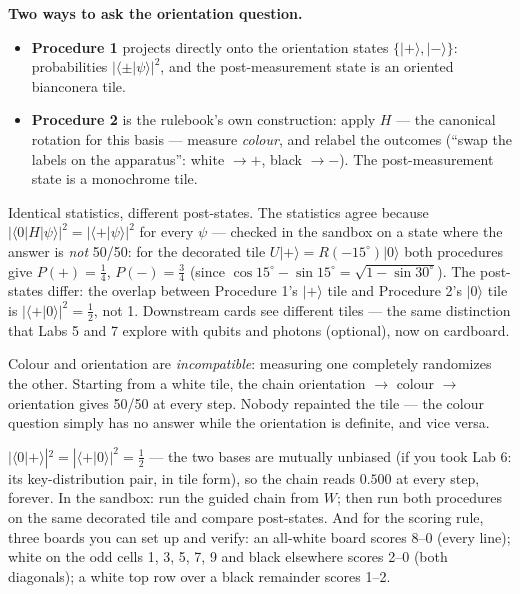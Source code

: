 \documentclass[a4paper,11pt]{article}
\providecommand{\ket}[1]{|#1\rangle}
\providecommand{\bra}[1]{\langle#1|}
\providecommand{\braket}[2]{\langle#1|#2\rangle}
\begin{document}
\begin{procedurebox}
\textbf{Two ways to ask the orientation question.}
\begin{itemize}
    \item \textbf{Procedure 1} projects directly onto the orientation states
          $\{\ket{+}, \ket{-}\}$: probabilities $|\braket{\pm}{\psi}|^2$, and the
          post-measurement state is an oriented bianconera tile.
    \item \textbf{Procedure 2} is the rulebook's own construction: apply $H$ --- the
          canonical rotation for this basis --- measure \emph{colour}, and relabel the
          outcomes (``swap the labels on the apparatus'': white $\to +$, black $\to -$). The
          post-measurement state is
          a monochrome tile.
\end{itemize}
Identical statistics, different post-states. The statistics agree because
$|\bra{0}H\ket{\psi}|^2 = |\braket{+}{\psi}|^2$ for every $\psi$ --- checked in the
sandbox on a state where the answer is \emph{not} 50/50: for the decorated tile
$U\ket{+} = R(-15^\circ)\ket{0}$ both procedures give $P(+) = \tfrac14$,
$P(-) = \tfrac34$ (since $\cos 15^\circ - \sin 15^\circ = \sqrt{1 - \sin 30^\circ}$).
The post-states differ: the overlap between Procedure 1's $\ket{+}$ tile and
Procedure 2's $\ket{0}$ tile is $|\braket{+}{0}|^2 = \tfrac12$, not 1. Downstream
cards see different tiles --- the same distinction that Labs 5 and 7 explore with
qubits and photons (optional), now on cardboard.
\end{procedurebox}

Colour and orientation are \emph{incompatible}: measuring one completely randomizes the
other. Starting from a white tile, the chain orientation $\to$ colour $\to$ orientation
gives 50/50 at every step. Nobody repainted the tile --- the colour question simply has
no answer while the orientation is definite, and vice versa.

\begin{numberbox}
$|\braket{0}{+}|^2 = |\braket{+}{0}|^2 = \tfrac12$ --- the two bases are mutually
unbiased (if you took Lab 6: its key-distribution pair, in tile form), so the chain reads $0.500$ at
every step, forever. In the sandbox: run the guided chain from $W$; then run both
procedures on the same decorated tile and compare post-states. And for the scoring
rule, three boards you can set up and verify: an all-white board scores 8--0 (every
line); white on the odd cells 1, 3, 5, 7, 9 and black elsewhere scores 2--0 (both
diagonals); a white top row over a black remainder scores 1--2.
\end{numberbox}
\end{document}
